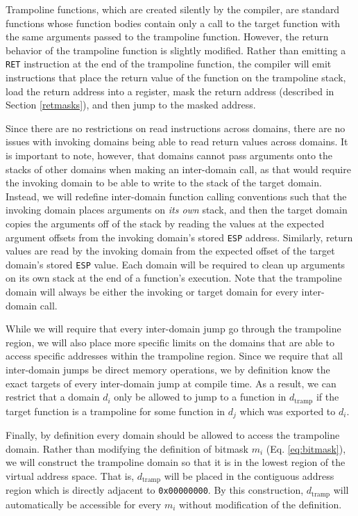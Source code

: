 \documentclass[12pt]{article}
\begin{document}
Trampoline functions, which are created silently by the compiler, are standard functions whose function bodies contain only a call to the target function with the same arguments passed to the trampoline function. However, the return behavior of the trampoline function is slightly modified. Rather than emitting a \texttt{RET} instruction at the end of the trampoline function, the compiler will emit instructions that place the return value of the function on the trampoline stack, load the return address into a register, mask the return address (described in Section \ref{retmasks}), and then jump to the masked address.

Since there are no restrictions on read instructions across domains, there are no issues with invoking domains being able to read return values across domains. It is important to note, however, that domains cannot pass arguments onto the stacks of other domains when making an inter-domain call, as that would require the invoking domain to be able to write to the stack of the target domain. Instead, we will redefine inter-domain function calling conventions such that the invoking domain places arguments on \textit{its own} stack, and then the target domain copies the arguments off of the stack by reading the values at the expected argument offsets from the invoking domain's stored \texttt{ESP} address. Similarly, return values are read by the invoking domain from the expected offset of the target domain's stored \texttt{ESP} value. Each domain will be required to clean up arguments on its own stack at the end of a function's execution. Note that the trampoline domain will always be either the invoking or target domain for every inter-domain call.

While we will require that every inter-domain jump go through the trampoline region, we will also place more specific limits on the domains that are able to access specific addresses within the trampoline region. Since we require that all inter-domain jumps be direct memory operations, we by definition know the exact targets of every inter-domain jump at compile time. As a result, we can restrict that a domain $d_i$ only be allowed to jump to a function in $d_\text{tramp}$ if the target function is a trampoline for some function in $d_j$ which was exported to $d_i$.

Finally, by definition every domain should be allowed to access the trampoline domain. Rather than modifying the definition of bitmask $m_i$ (Eq. \ref{eq:bitmask}), we will construct the trampoline domain so that it is in the lowest region of the virtual address space. That is, $d_\text{tramp}$ will be placed in the contiguous address region which is directly adjacent to \texttt{0x00000000}. By this construction, $d_\text{tramp}$ will automatically be accessible for every $m_i$ without modification of the definition.
\end{document}
